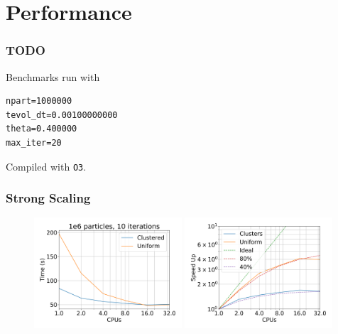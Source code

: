 \section{Performance}

\begin{frame}[fragile]
	\frametitle{TODO}
	Benchmarks run with
\begin{lstlisting}
npart=1000000
tevol_dt=0.00100000000
theta=0.400000
max_iter=20
\end{lstlisting}
	Compiled with \lstinline|O3|.
\end{frame}

\begin{frame}
	\frametitle{Strong Scaling}
	\begin{figure}
		\centering
		\includegraphics[width=0.49\textwidth]{inclfigs/strong_time.png}
		\includegraphics[width=0.49\textwidth]{inclfigs/strong_speedup.png}
	\end{figure}
\end{frame}


